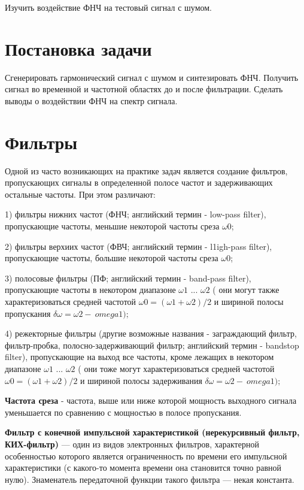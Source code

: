 \documentclass[12pt,a4paper]{scrartcl}
\begin{document}
Изучить воздействие ФНЧ на тестовый сигнал с шумом.\\

\section{Постановка задачи}
\label{sec:task}

Сгенерировать гармонический сигнал с шумом и синтезировать ФНЧ. Получить сигнал во временной и частотной областях до и после фильтрации. Сделать выводы о воздействии ФНЧ на спектр сигнала.\\

\section{Фильтры}
\label{sec:teoriya}

Одной из часто возникающих на практике задач является создание фильтров,
пропускающих сигналы в определенной полосе частот и задерживающих остальные
частоты. При этом различают:

1) фильтры нижних частот (ФНЧ; английский термин - low-pass filter), пропускающие
частоты, меньшие некоторой частоты среза $\omega 0$;

2) фильтры верхиих частот (ФВЧ; английский термин - l1igh-pass filter), пропускающие
частоты, большие некоторой частоты среза $\omega 0$;

3) полосовые фильтры (ПФ; английский термин - band-pass filter), пропускающие
частоты в некотором диапазоне $\omega 1$ ... $\omega 2$ ( они могут также характеризоваться
средней частотой $\omega 0 = (\omega 1 + \omega 2)/ 2 $ и шириной полосы пропускания $\delta \omega = \omega 2 - \ omega 1);$

4) режекторные фильтры (другие возможные названия - заграждающий фильтр,
фильтр-пробка, полосно-задерживающий фильтр; английский термин - bandstop
filter), пропускающие на выход все частоты, кроме лежащих в некотором
диапазоне $\omega 1$ ... $\omega 2$ ( они тоже могут характеризоваться средней частотой  $\omega 0 = (\omega 1 + \omega 2)/ 2 $ и шириной полосы задерживания $\delta \omega = \omega 2 - \ omega 1);$

\textbf{Частота среза} - частота, выше или ниже которой мощность выходного сигнала уменьшается по сравнению с мощностью в полосе пропускания.

\textbf{Фильтр с конечной импульсной характеристикой (нерекурсивный фильтр, КИХ-фильтр)} — один из видов электронных фильтров, характерной особенностью которого является ограниченность по времени его импульсной характеристики (с какого-то момента времени она становится точно равной нулю). Знаменатель передаточной функции такого фильтра — некая константа. 
\end{document}

